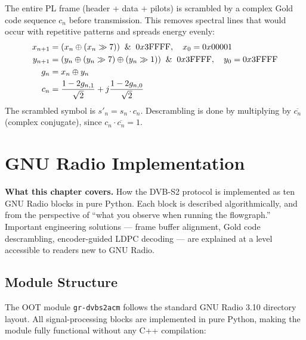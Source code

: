 \documentclass[12pt,a4paper]{report}
\begin{document}
The entire PL frame (header + data + pilots) is scrambled by a complex Gold
code sequence $c_n$ before transmission. This removes spectral lines that would
occur with repetitive patterns and spreads energy evenly:
\begin{align}
    x_{n+1} &= (x_n \oplus (x_n \gg 7)) \And 0x3\text{FFFF}, \quad x_0 = 0x00001 \\
    y_{n+1} &= (y_n \oplus (y_n \gg 7) \oplus (y_n \gg 1)) \And 0x3\text{FFFF},
               \quad y_0 = 0x3\text{FFFF} \\
    g_n     &= x_n \oplus y_n \\
    c_n     &= \frac{1 - 2g_{n,1}}{\sqrt{2}} + j\frac{1 - 2g_{n,0}}{\sqrt{2}}
\end{align}
The scrambled symbol is $s'_n = s_n \cdot c_n$. Descrambling is done by
multiplying by $\overline{c_n}$ (complex conjugate), since $c_n \cdot
\overline{c_n} = 1$.

\chapter{GNU Radio Implementation}

\begin{keyinsight}
\textbf{What this chapter covers.}
How the DVB-S2 protocol is implemented as ten GNU Radio blocks in pure Python.
Each block is described algorithmically, and from the perspective of ``what you
observe when running the flowgraph.''  Important engineering solutions --- frame
buffer alignment, Gold code descrambling, encoder-guided LDPC decoding --- are
explained at a level accessible to readers new to GNU Radio.
\end{keyinsight}

\section{Module Structure}

The OOT module \texttt{gr-dvbs2acm} follows the standard GNU Radio 3.10
directory layout. All signal-processing blocks are implemented in pure Python,
making the module fully functional without any C++ compilation:
\end{document}
